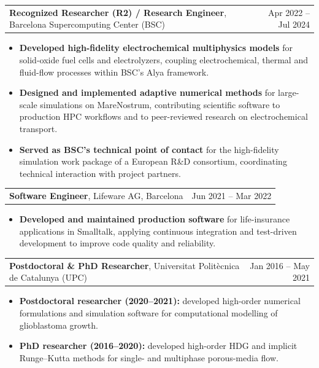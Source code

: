 \documentclass[10pt,a4paper]{article}
\makeatletter
\newcommand{\dates}[1]{{\sffamily\fontsize{8.8}{10.5}\selectfont\color{muted}#1}}
\newcommand{\org}[1]{{\color{ink}\textbf{#1}}}
\newcommand{\entrysep}{\vspace{3pt}}
\newcommand{\role}[3]{%
  \begin{tabularx}{\textwidth}{@{}X r@{}}
    \org{#1}, #2 & \dates{#3} \\
  \end{tabularx}%
  \vspace{-1.2pt}}
\makeatother
\begin{document}
\entrysep
\role{Recognized Researcher (R2) / Research Engineer}{Barcelona Supercomputing Center (BSC)}{Apr 2022 -- Jul 2024}
\begin{itemize}

\item \org{Developed high-fidelity electrochemical multiphysics models}
for solid-oxide fuel cells and electrolyzers, coupling electrochemical,
thermal and fluid-flow processes within BSC's Alya framework.

\item \org{Designed and implemented adaptive numerical methods}
for large-scale simulations on MareNostrum, contributing scientific software
to production HPC workflows and to peer-reviewed research on electrochemical
transport.

\item \org{Served as BSC's technical point of contact}
for the high-fidelity simulation work package of a European R\&D consortium,
coordinating technical interaction with project partners.

\end{itemize}

\entrysep
\role{Software Engineer}{Lifeware AG, Barcelona}{Jun 2021 -- Mar 2022}
\begin{itemize}
  \item \org{Developed and maintained production software} for life-insurance applications in Smalltalk, applying continuous integration and test-driven development to improve code quality and reliability.
\end{itemize}

\entrysep
\role{Postdoctoral \& PhD Researcher}{Universitat Politècnica de Catalunya (UPC)}{Jan 2016 -- May 2021}
\begin{itemize}
\item \org{Postdoctoral researcher (2020--2021):} developed high-order numerical formulations and simulation software for computational modelling of glioblastoma growth.
\item \org{PhD researcher (2016--2020):} developed high-order HDG and implicit Runge--Kutta methods for single- and multiphase porous-media flow.
\end{itemize}
\end{document}
